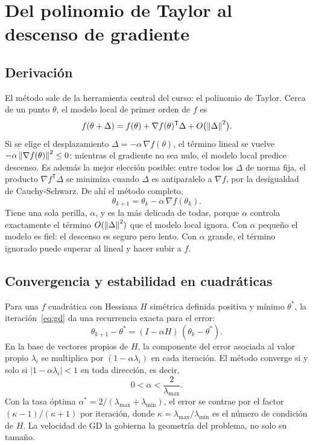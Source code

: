 \section{Del polinomio de Taylor al descenso de gradiente}\label{sec:gd}

\subsection{Derivación}

El método sale de la herramienta central del curso: el polinomio de Taylor. Cerca de un punto $\theta$, el modelo local de primer orden de $f$ es
\begin{equation}
  f(\theta + \Delta) = f(\theta) + \nabla f(\theta)^{\mathsf{T}}\Delta + O\bigl(\left\lVert \Delta \right\rVert^2\bigr).
  \label{eq:taylor}
\end{equation}
Si se elige el desplazamiento $\Delta = -\alpha\,\nabla f(\theta)$, el término lineal se vuelve $-\alpha\left\lVert \nabla f(\theta) \right\rVert^2 \leq 0$: mientras el gradiente no sea nulo, el modelo local predice descenso. Es además la mejor elección posible: entre todos los $\Delta$ de norma fija, el producto $\nabla f^{\mathsf{T}}\Delta$ se minimiza cuando $\Delta$ es antiparalelo a $\nabla f$, por la desigualdad de Cauchy-Schwarz. De ahí el método completo,
\begin{equation}
  \theta_{k+1} = \theta_k - \alpha\,\nabla f(\theta_k).
  \label{eq:gd}
\end{equation}
Tiene una sola perilla, $\alpha$, y es la más delicada de todas, porque $\alpha$ controla exactamente el término $O(\left\lVert \Delta \right\rVert^2)$ que el modelo local ignora. Con $\alpha$ pequeño el modelo es fiel: el descenso es seguro pero lento. Con $\alpha$ grande, el término ignorado puede superar al lineal y hacer subir a $f$.

\subsection{Convergencia y estabilidad en cuadráticas}

Para una $f$ cuadrática con Hessiana $H$ simétrica definida positiva y mínimo $\theta^*$, la iteración~\eqref{eq:gd} da una recurrencia exacta para el error:
\begin{equation}
  \theta_{k+1} - \theta^* = (I - \alpha H)\,(\theta_k - \theta^*).
  \label{eq:recurrencia}
\end{equation}
En la base de vectores propios de $H$, la componente del error asociada al valor propio $\lambda_i$ se multiplica por $(1 - \alpha\lambda_i)$ en cada iteración. El método converge si y solo si $|1 - \alpha\lambda_i| < 1$ en toda dirección, es decir,
\begin{equation}
  0 < \alpha < \frac{2}{\lambda_{\max}}.
  \label{eq:estabilidad}
\end{equation}
Con la tasa óptima $\alpha^* = 2/(\lambda_{\max} + \lambda_{\min})$, el error se contrae por el factor $(\kappa - 1)/(\kappa + 1)$ por iteración, donde $\kappa = \lambda_{\max}/\lambda_{\min}$ es el número de condición de $H$. La velocidad de GD la gobierna la geometría del problema, no solo su tamaño.

